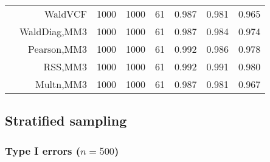 \documentclass[
]{article}
\begin{document}
\begin{table}[H]
{\begin{tabular}[t]{lrrrrrrr}
\hspace{1em} & WaldVCF & 1000 & 1000 & 61 & 0.987 & 0.981 & 0.965\\

\hspace{1em} & WaldDiag,MM3 & 1000 & 1000 & 61 & 0.987 & 0.984 & 0.974\\

\hspace{1em} & Pearson,MM3 & 1000 & 1000 & 61 & 0.992 & 0.986 & 0.978\\

\hspace{1em} & RSS,MM3 & 1000 & 1000 & 61 & 0.992 & 0.991 & 0.980\\

\hspace{1em} & Multn,MM3 & 1000 & 1000 & 61 & 0.987 & 0.981 & 0.967\\
\bottomrule
\end{tabular}}
\endgroup{}
\end{table}

\subsection{Stratified sampling}\label{stratified-sampling}

\subsubsection{\texorpdfstring{Type I errors
(\(n=500\))}{Type I errors (n=500)}}\label{type-i-errors-n500-1}
\end{document}
